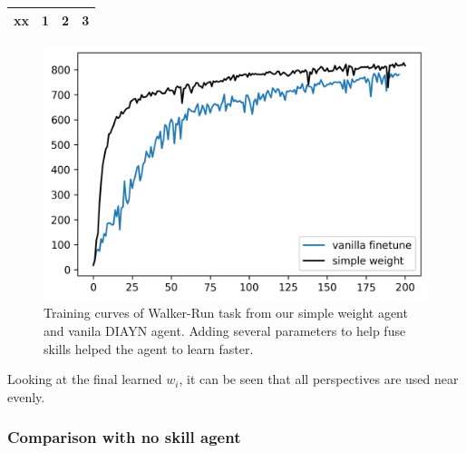 



\begin{tabu} to \textwidth {XXXX}
   \toprule
   xx & 1 & 2 & 3 \\
   \bottomrule
\end{tabu}



\begin{figure}[ht]
  \vskip 0.2in
  \begin{center}
  \centerline{\includegraphics[width=\columnwidth]{Figures/walker_run_simple_weight.png}}
  \caption{Training curves of Walker-Run task from our simple weight agent and vanila DIAYN agent.
  Adding several parameters to help fuse skills helped the agent to learn faster.}
  \label{walker-run-simple-weight}
  \end{center}
  \vskip -0.2in
  \end{figure}


Looking at the final learned ${w_i}$, it can be seen that all perspectives are used near evenly.

\subsubsection{Comparison with no skill agent}

